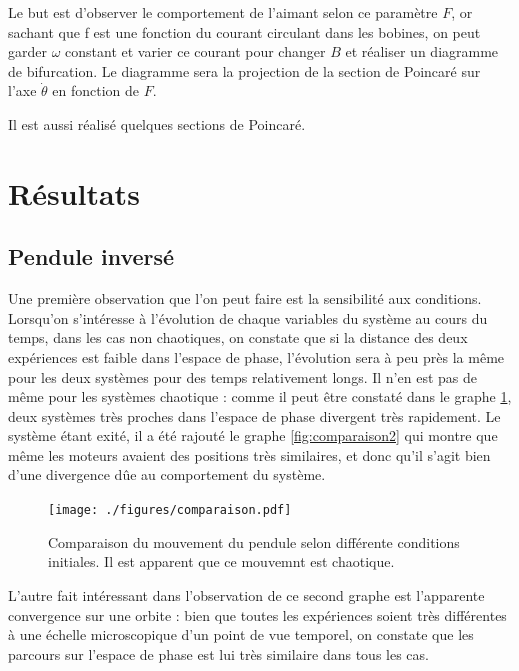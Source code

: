 \documentclass[a4paper,12pt,oneside]{article}
\begin{document}
Le but est d'observer le comportement de l'aimant selon ce paramètre $F$, or sachant que f est une fonction du courant circulant dans les bobines, on peut garder $\omega$ constant et varier ce courant pour changer $B$ et réaliser un diagramme de bifurcation. Le diagramme sera la projection de la section de Poincaré sur l'axe $\dot{\theta}$ en fonction de $F$.

Il est aussi réalisé quelques sections de Poincaré.



\section{Résultats}

\subsection{Pendule inversé}

Une première observation que l'on peut faire est la sensibilité aux conditions.
Lorsqu'on s'intéresse à l'évolution de chaque variables du système au cours du temps, dans les cas non chaotiques, on constate que si la distance des deux expériences est faible dans l'espace de phase, l'évolution sera à peu près la même pour les deux systèmes pour des temps relativement longs. Il n'en est pas de même pour les systèmes chaotique : comme il peut être constaté dans le graphe \ref{fig:comparaison}, deux systèmes très proches dans l'espace de phase divergent très rapidement. Le système étant exité, il a été rajouté le graphe \ref{fig:comparaison2} qui montre que même les moteurs avaient des positions très similaires, et donc qu'il s'agit bien d'une divergence dûe au comportement du système.

 

\begin{figure}[h!]
  \begin{center}
  \texttt{[image: ./figures/comparaison.pdf]}
  \caption{Comparaison du mouvement du pendule selon différente conditions initiales. Il est apparent que ce mouvemnt est chaotique. %
  } \label{fig:comparaison}
  \end{center}
\end{figure}

L'autre fait intéressant dans l'observation de ce second graphe est l'apparente convergence sur une orbite : bien que toutes les expériences soient très différentes à une échelle microscopique d'un point de vue temporel, on constate que les parcours sur l'espace de phase est lui très similaire dans tous les cas.
\end{document}

